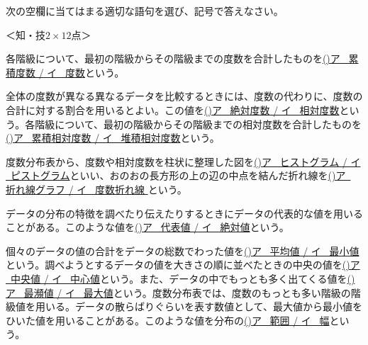 \documentclass[
  12pt,a4paper,lualatex,ja=standard]{bxjsarticle}
\begin{document}
\begin{flushleft}

\noindent{} \hspace{1pt}次の空欄に当てはまる適切な語句を選び、記号で答えなさい。

%
\begin{flushright}%
\footnotesize{＜知・技$2 \times 12$点＞}%
\end{flushright}%


各階級について、最初の階級からその階級までの度数を合計したものを\underline{()\hspace{2.5pt}ア \, 累積度数 / イ \, 度数}という。

全体の度数が異なる異なるデータを比較するときには、度数の代わりに、度数の合計に対する割合を用いるとよい。この値を\underline{()\hspace{2.5pt}ア \, 絶対度数 /  イ \, 相対度数}という。各階級について、最初の階級からその階級までの相対度数を合計したものを\underline{()\hspace{2.5pt}ア \, 累積相対度数 / イ \, 堆積相対度数}という。

度数分布表から、度数や相対度数を柱状に整理した図を\underline{()\hspace{2.5pt}ア \, ヒストグラム / イ \, ピストグラム}といい、おのおの長方形の上の辺の中点を結んだ折れ線を\underline{()\hspace{2.5pt}ア \, 折れ線グラフ / イ \, 度数折れ線 }という。

データの分布の特徴を調べたり伝えたりするときにデータの代表的な値を用いることがある。このような値を\underline{()\hspace{2.5pt}ア \, 代表値 / イ \, 絶対値}という。

個々のデータの値の合計をデータの総数でわった値を\underline{()\hspace{2.5pt}ア \, 平均値 / イ \, 最小値}という。調べようとするデータの値を大きさの順に並べたときの中央の値を\underline{()\hspace{2.5pt}ア \, 中央値 / イ \, 中心値}という。また、データの中でもっとも多く出てくる値を\underline{()\hspace{2.5pt}ア \, 最瀕値 / イ \, 最大値}という。度数分布表では、度数のもっとも多い階級の階級値を用いる。データの散らばりぐらいを表す数値として、最大値から最小値をひいた値を用いることがある。このような値を分布の\underline{()\hspace{2.5pt}ア \, 範囲 / イ \, 幅}という。


\end{flushleft}
\end{document}
